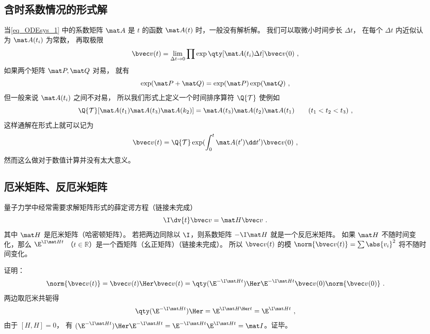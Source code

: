 \subsection{含时系数情况的形式解}
当\autoref{eq_ODEsys_1} 中的系数矩阵 $\mat A$ 是 $t$ 的函数 $\mat A(t)$ 时，一般没有解析解。 我们可以取微小时间步长 $\Delta t$， 在每个 $\Delta t$ 内近似认为 $\mat A(t_i)$ 为常数， 再取极限
\begin{equation}
\bvec v(t) = \lim_{\Delta t \to 0} \prod \exp\qty[\mat A(t_i)\Delta t] \bvec v(0)~,
\end{equation}
如果两个矩阵 $\mat P, \mat Q$ 对易， 就有
\begin{equation}
\exp(\mat P + \mat Q) = \exp(\mat P)\exp(\mat Q)~,
\end{equation}
但一般来说 $\mat A(t_i)$ 之间不对易， 所以我们形式上定义一个时间排序算符 $\Q{\mathcal T}$ 使例如
\begin{equation}
\Q {\mathcal T} [\mat A(t_1) \mat A(t_3) \mat A(k_2)] = \mat A(t_3) \mat A(t_2) \mat A(t_1) \qquad ( t_1 < t_2 < t_3 )~,
\end{equation}
这样通解在形式上就可以记为
\begin{equation}\label{eq_ODEsys_3}
\bvec v(t) = \Q {\mathcal T} \exp(\int_0^ t \mat A(t')\dd t') \bvec v(0)~,
\end{equation}
然而这么做对于数值计算并没有太大意义。

\subsection{厄米矩阵、反厄米矩阵}
量子力学中经常需要求解矩阵形式的薛定谔方程（链接未完成）
\begin{equation}
\I \dv{t} \bvec v = \mat H \bvec v~.
\end{equation}
其中 $\mat H$ 是厄米矩阵（哈密顿矩阵）。 若把两边同除以 $\I$，则系数矩阵 $-\I\mat H$ 就是一个反厄米矩阵。 如果 $\mat H$ 不随时间变化，那么 $\E^{\I \mat H t}$ （$t\in \mathbb R$）是一个酉矩阵（幺正矩阵）（链接未完成）。 所以 $\bvec v(t)$ 的模 $\norm{\bvec v(t)} = \sum \abs{v_i}^2$ 将不随时间变化。

证明：
\begin{equation}
\norm{\bvec v(t)} = \bvec v(t)\Her\bvec v(t) = \qty(\E^{-\I\mat H t})\Her\E^{-\I\mat H t}\bvec v(0)\norm{\bvec v(0)}~.
\end{equation}
两边取厄米共轭得
\begin{equation}
\qty(\E^{-\I \mat H t})\Her = \E^{\I \mat H\Her t} = \E^{\I \mat H t}~,
\end{equation}
由于 $[H,H] = 0$， 有 $(\E^{-\I \mat H t})\Her \E^{-\I \mat H t} = \E^{-\I \mat H t}\E^{\I \mat H t} = \mat I$。证毕。

